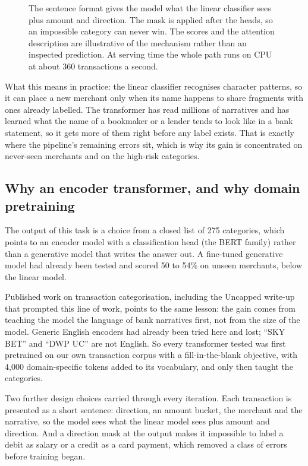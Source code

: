 \begin{figure}[H]
{}
\caption*{The sentence format gives the model what the linear classifier sees plus amount and direction. The mask is applied after the heads, so an impossible category can never win. The scores and the attention description are illustrative of the mechanism rather than an inspected prediction. At serving time the whole path runs on CPU at about 360 transactions a second.}
\end{figure}

What this means in practice: the linear classifier recognises character patterns, so it can place a new merchant only when its name happens to share fragments with ones already labelled. The transformer has read millions of narratives and has learned what the name of a bookmaker or a lender tends to look like in a bank statement, so it gets more of them right before any label exists. That is exactly where the pipeline's remaining errors sit, which is why its gain is concentrated on never-seen merchants and on the high-risk categories.

\subsection{Why an encoder transformer, and why domain pretraining}
The output of this task is a choice from a closed list of 275 categories, which points to an encoder model with a classification head (the BERT family) rather than a generative model that writes the answer out. A fine-tuned generative model had already been tested and scored 50 to 54\% on unseen merchants, below the linear model.

Published work on transaction categorisation, including the Uncapped write-up that prompted this line of work, points to the same lesson: the gain comes from teaching the model the language of bank narratives first, not from the size of the model. Generic English encoders had already been tried here and lost; ``SKY BET'' and ``DWP UC'' are not English. So every transformer tested was first pretrained on our own transaction corpus with a fill-in-the-blank objective, with 4,000 domain-specific tokens added to its vocabulary, and only then taught the categories.

Two further design choices carried through every iteration. Each transaction is presented as a short sentence: direction, an amount bucket, the merchant and the narrative, so the model sees what the linear model sees plus amount and direction. And a direction mask at the output makes it impossible to label a debit as salary or a credit as a card payment, which removed a class of errors before training began.

